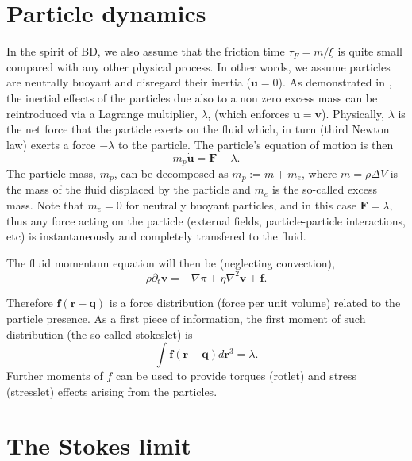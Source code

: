 \documentclass[ twoside,openright,titlepage,numbers=noenddot,%
headinclude,footinclude,cleardoublepage=empty,abstract=on,
BCOR=5mm,paper=a4,fontsize=11pt, dvipsnames
]{scrreprt}
\renewcommand{\vec}[1]{\bm{#1}}
\newcommand{\ppos}{q}
\newcommand{\pvel}{u}
\newcommand{\fpos}{r}
\newcommand{\fvel}{v}
\begin{document}
\section*{Particle dynamics}
In the spirit of \gls{BD}, we also assume that the friction time $\tau_F = m/\xi$ is quite small compared with any other physical process. In other words, we assume particles are neutrally buoyant and disregard their inertia ($\dot{\vec{\pvel}} = 0$). As demonstrated in \cite{Balboa2014}, the inertial effects of the particles due also to a non zero excess mass can be reintroduced via a Lagrange multiplier, $\lambda$, (which enforces $\vec{\pvel} = \vec{\fvel}$). Physically, $\lambda$ is the net force that the particle exerts on the fluid which, in turn (third Newton law) exerts a force $-\lambda$ to the particle. The particle's equation of motion is then
\begin{equation}
  \label{eq:inertiallagrande}
m_p \dot{\vec{\pvel}} = \vec{F} - \lambda.
\end{equation}
The particle mass, $m_p$, can be decomposed as $m_p := m + m_e$, where $m=\rho\Delta V$ is the mass of the fluid displaced by the particle and $m_e$ is the so-called excess mass. Note that $m_e=0$ for neutrally buoyant particles, and in this case $\vec{F} = \lambda$, thus any force acting on the particle (external fields, particle-particle interactions, etc) is instantaneously and completely transfered to the fluid.


The fluid momentum equation will then be (neglecting convection),
\begin{equation}
\rho \partial_t\vec{\fvel} = -\nabla \pi + \eta \nabla^2\vec{\fvel} + \vec{f}.
\end{equation}

Therefore $\vec{f(\vec{\fpos}-\vec{\ppos})}$ is a force distribution (force per unit volume) related to the particle presence. As a first piece of information, the first moment of such distribution (the so-called stokeslet) is
$$\int{\vec{f(\vec{\fpos}-\vec{\ppos})}d\vec{\fpos}^3} = \lambda.$$
Further moments of $f$ can be used to provide torques (rotlet) and stress (stresslet) effects arising from the particles.

\section*{The Stokes limit}
\end{document}
